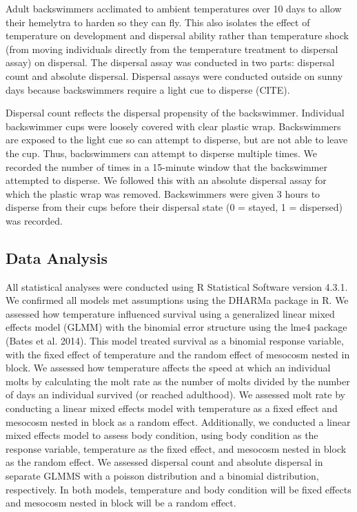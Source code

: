 \documentclass[
]{article}
\begin{document}
Adult backswimmers acclimated to ambient temperatures over 10 days to
allow their hemelytra to harden so they can fly. This also isolates the
effect of temperature on development and dispersal ability rather than
temperature shock (from moving individuals directly from the temperature
treatment to dispersal assay) on dispersal. The dispersal assay was
conducted in two parts: dispersal count and absolute dispersal.
Dispersal assays were conducted outside on sunny days because
backswimmers require a light cue to disperse (CITE).

Dispersal count reflects the dispersal propensity of the backswimmer.
Individual backswimmer cups were loosely covered with clear plastic
wrap. Backswimmers are exposed to the light cue so can attempt to
disperse, but are not able to leave the cup. Thus, backswimmers can
attempt to disperse multiple times. We recorded the number of times in a
15-minute window that the backswimmer attempted to disperse. We followed
this with an absolute dispersal assay for which the plastic wrap was
removed. Backswimmers were given 3 hours to disperse from their cups
before their dispersal state (0 = stayed, 1 = dispersed) was recorded.

\subsection{Data Analysis}\label{data-analysis}

All statistical analyses were conducted using R Statistical Software
version 4.3.1. We confirmed all models met assumptions using the DHARMa
package in R. We assessed how temperature influenced survival using a
generalized linear mixed effects model (GLMM) with the binomial error
structure using the lme4 package (Bates et al. 2014). This model treated
survival as a binomial response variable, with the fixed effect of
temperature and the random effect of mesocosm nested in block. We
assessed how temperature affects the speed at which an individual molts
by calculating the molt rate as the number of molts divided by the
number of days an individual survived (or reached adulthood). We
assessed molt rate by conducting a linear mixed effects model with
temperature as a fixed effect and mesocosm nested in block as a random
effect. Additionally, we conducted a linear mixed effects model to
assess body condition, using body condition as the response variable,
temperature as the fixed effect, and mesocosm nested in block as the
random effect. We assessed dispersal count and absolute dispersal in
separate GLMMS with a poisson distribution and a binomial distribution,
respectively. In both models, temperature and body condition will be
fixed effects and mesocosm nested in block will be a random effect.
\end{document}

